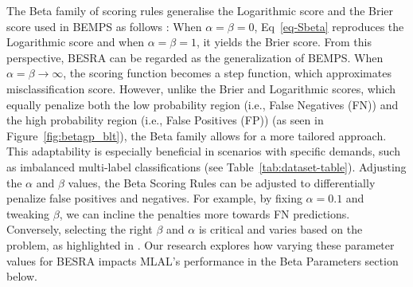 \documentclass[letterpaper]{article} %
\begin{document}
The Beta family of scoring rules generalise the Logarithmic score and the Brier score used in BEMPS as follows \cite{merkle2013choosing}:
When $\alpha=\beta=0$, Eq~\eqref{eq-Sbeta} reproduces the Logarithmic score
and when $\alpha=\beta=1$, it yields the Brier score.
From this perspective, BESRA can be regarded as the generalization of BEMPS.
When $\alpha = \beta \rightarrow \infty$, the scoring function becomes a step function, which approximates misclassification score. 
However, unlike the Brier and Logarithmic scores, which equally penalize both the low probability region (i.e., False Negatives (FN)) and the high probability region (i.e., False Positives (FP)) (as seen in Figure~\ref{fig:betagp_blt}), the Beta family allows for a more tailored approach. 
This adaptability is especially beneficial in scenarios with specific demands, such as imbalanced multi-label classifications (see Table~\ref{tab:dataset-table}).
Adjusting the $\alpha$ and $\beta$ values, the Beta Scoring Rules can be adjusted to differentially penalize false positives and negatives.
For example, by fixing $\alpha=0.1$ and tweaking $\beta$, we can incline the penalties more towards FN predictions.
Conversely, selecting the right $\beta$ and $\alpha$ is critical and varies based on the problem, as highlighted in \citep{merkle2013choosing, doi:10.1198/016214506000001437}. Our research explores how varying these parameter values for BESRA impacts MLAL's performance in the Beta Parameters section below. 
\end{document}
